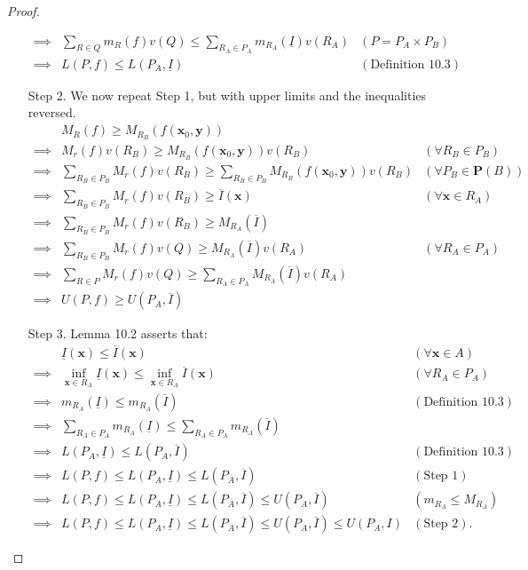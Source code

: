 \documentclass{article}
\newcommand{\x}{\mathbf{x}}
\newcommand{\y}{\mathbf{y}}
\theoremstyle{definition}
\begin{document}
\begin{proof}
\begin{enumerate}
\begin{align*}
 			\implies & \sum_{R\in Q}m_{R}(f)v(Q) \le \sum_{R_A\in P_A}m_{R_A}(\underline{I})v(R_A) & (P = P_A\times P_B)\\ 
 			\implies & L(P,f)\le L(P_A, \underline{I})&(\text{Definition }10.3)
 		\end{align*}
 		\item [Step 2.] We now repeat Step 1, but with upper limits and the inequalities reversed. 
 		\begin{align*}
 			&M_R(f) \ge M_{R_B}(f(\x_0,\y)) \\ 
 			\implies & M_r(f)v(R_B) \ge M_{R_B}(f(\x_0,\y))v(R_B) & (\forall R_B\in P_B)\\ 
 			\implies& \sum_{R_B\in P_B}M_r(f)v(R_B) \ge \sum_{R_B\in P_B}M_{R_B}(f(\x_0,\y))v(R_B) & (\forall  P_B\in \mathbf P(B)) \\ 
 			\implies &  \sum_{R_B\in P_B}M_r(f)v(R_B) \ge \overline I(\x) & (\forall \x \in R_A)\\ 
 			\implies & \sum_{R_B\in P_B}M_r(f)v(R_B) \ge M_{R_A}(\overline I) \\ 
 			\implies & \sum_{R_B\in P_B}M_r(f)v(Q) \ge M_{R_A}(\overline I) v(R_A)& (\forall R_A \in P_A)\\
 			\implies & \sum_{R\in P}M_r(f)v(Q) \ge \sum_{R_A\in P_A}M_{R_A}(\overline I) v(R_A)\\
 			\implies & U(P,f)\ge U(P_A, \overline{I}) 
 		\end{align*}
 		\item [Step 3.] Lemma 10.2 asserts that:
 		\begin{align*}
 			&\underline I(\x) \le \overline{I}(\x)   & (\forall \x \in A) \\ 
 			\implies & \inf_{\x\in R_A}\underline I(\x) \le \inf_{\x\in R_A}\overline{I}(\x)  & (\forall R_A\in P_A)\\
 			\implies & m_{R_A}(\underline I) \le m_{R_A}(\overline{I}) & (\text{Definition }10.3) \\ 
 			\implies & \sum_{R_A\in P_A} m_{R_A}(\underline I) \le  \sum_{R_A\in P_A} m_{R_A}(\overline I)\\
 			\implies & L(P_A,\underline I) \le L(P_A, \overline I) & (\text{Definition }10.3)\\ 
 			\implies & L(P,f) \le L(P_A,\underline I) \le L(P_A, \overline I)  & (\text{Step 1})\\ 
 			\implies &  L(P,f) \le L(P_A,\underline I) \le L(P_A, \overline I) \le U(P_A ,\overline I) & (m_{R_A} \le M_{R_A}) \\ 
 			\implies & L(P,f) \le L(P_A,\underline I) \le L(P_A, \overline I) \le U(P_A ,\overline I)  \le U(P_A, I) & (\text{Step 2}).

\end{align*}
\end{enumerate}
\end{proof}
\end{document}
